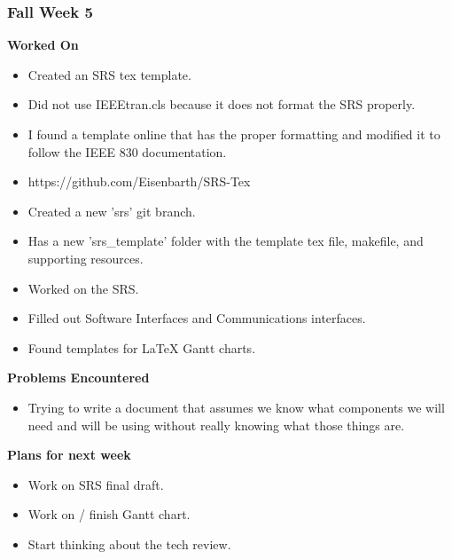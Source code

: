\documentclass[compsoc,draftclsnofoot,onecolumn,10pt]{IEEEtran}
\begin{document}
\subsubsection*{Fall Week 5}
\textbf{Worked On}
\begin{itemize}
    \item Created an SRS tex template.
    \item Did not use IEEEtran.cls because it does not format the SRS properly.
    \item I found a template online that has the proper formatting and modified it to follow the IEEE 830 documentation.
    \item https://github.com/Eisenbarth/SRS-Tex
    \item Created a new 'srs' git branch.
    \item Has a new 'srs\_template' folder with the template tex file, makefile, and supporting resources.
    \item Worked on the SRS.
    \item Filled out Software Interfaces and Communications interfaces.
    \item Found templates for LaTeX Gantt charts.
\end{itemize}
\textbf{Problems Encountered}
\begin{itemize}
    \item Trying to write a document that assumes we know what components we will need and will be using without really knowing what those things are.
\end{itemize}
\textbf{Plans for next week}
\begin{itemize}
    \item Work on SRS final draft.
    \item Work on / finish Gantt chart.
    \item Start thinking about the tech review.
\end{itemize}
\end{document}
